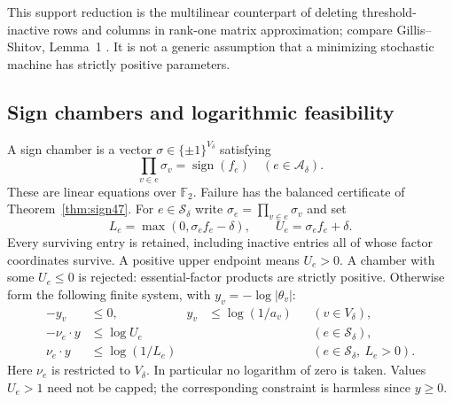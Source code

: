 This support reduction is the multilinear counterpart of deleting
threshold-inactive rows and columns in rank-one matrix approximation;
compare Gillis--Shitov, Lemma~1 \cite{GS19}. It is not a generic
assumption that a minimizing stochastic machine has strictly positive
parameters.

\subsection{Sign chambers and logarithmic feasibility}
A sign chamber is a vector $\sigma\in\{\pm1\}^{V_\delta}$ satisfying
\begin{equation}\label{eq:signchamber49}
 \prod_{v\in e}\sigma_v=\operatorname{sign}(f_e)
                         \quad(e\in\mathcal A_\delta).
\end{equation}
These are linear equations over $\mathbb F_2$. Failure has the balanced
certificate of Theorem~\ref{thm:sign47}. For $e\in\mathcal S_\delta$
write $\sigma_e=\prod_{v\in e}\sigma_v$ and set
\begin{equation}\label{eq:interval49}
 L_e=\max(0,\sigma_e f_e-\delta),\qquad U_e=\sigma_e f_e+\delta.
\end{equation}
Every surviving entry is retained, including inactive entries all of whose factor coordinates survive. A positive upper endpoint means $U_e>0$. A chamber with some $U_e\le0$ is rejected: essential-factor products
are strictly positive. Otherwise form the following finite system,
with $y_v=-\log|\theta_v|$:
\begin{equation}\label{eq:loglp49}
 \begin{aligned}
 -y_v&\le0,& y_v&\le\log(1/a_v) &&(v\in V_\delta),\\
 -\nu_e\cdot y&\le\log U_e&&&&(e\in\mathcal S_\delta),\\
 \nu_e\cdot y&\le\log(1/L_e)&&&&(e\in\mathcal S_\delta,\ L_e>0).
 \end{aligned}
\end{equation}
Here $\nu_e$ is restricted to $V_\delta$. In particular no logarithm
of zero is taken. Values $U_e>1$ need not be capped; the corresponding
constraint is harmless since $y\ge0$.

